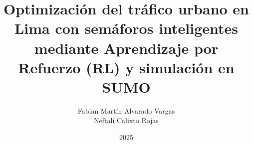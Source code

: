 \documentclass[a4paper,12pt,oneside]{tesisutec}
\begin{document}
\frontmatter


\title{Optimización del tráfico urbano en Lima con semáforos inteligentes mediante Aprendizaje por Refuerzo (RL) y simulación en SUMO}

\author{Fabian Martín Alvarado Vargas  \\ Neftalí Calixto Rojas }

\date{2025}

\maketitle





\tableofcontents
\newpage
\listoftables
\newpage
\listoffigures


\mainmatter
\pagestyle{fancy}












\renewcommand{\bibname}{\hfill\Large\bf{REFERENCIAS BIBLIOGRÁFICAS}\hfill}





\end{document}

